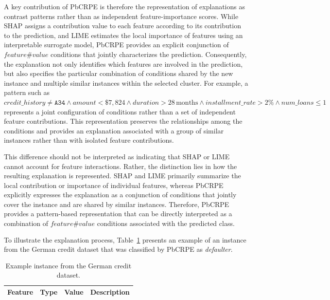 {A key contribution of PbCRPE is therefore the representation of explanations as contrast patterns rather than as independent feature-importance scores. While SHAP assigns a contribution value to each feature according to its contribution to the prediction, and LIME estimates the local importance of features using an interpretable surrogate model, PbCRPE provides an explicit conjunction of $feature\#value$ conditions that jointly characterizes the prediction. Consequently, the explanation not only identifies which features are involved in the prediction, but also specifies the particular combination of conditions shared by the new instance and multiple similar instances within the selected cluster. For example, a pattern such as $\mathit{credit\_history} \neq \texttt{A34} \wedge \mathit{amount} < \$7{,}824 \wedge \mathit{duration} > 28\,\mathrm{months} \wedge \mathit{installment\_rate} > 2\% \wedge \mathit{num\_loans} \leq 1$ represents a joint configuration of conditions rather than a set of independent feature contributions. This representation preserves the relationships among the conditions and provides an explanation associated with a group of similar instances rather than with isolated feature contributions.\newline

This difference should not be interpreted as indicating that SHAP or LIME cannot account for feature interactions. Rather, the distinction lies in how the resulting explanation is represented. SHAP and LIME primarily summarize the local contribution or importance of individual features, whereas PbCRPE explicitly expresses the explanation as a conjunction of conditions that jointly cover the instance and are shared by similar instances. Therefore, PbCRPE provides a pattern-based representation that can be directly interpreted as a combination of $feature\#value$ conditions associated with the predicted class.\newline

To illustrate the explanation process, Table~\ref{tab:example_instance} presents an example of an instance from the German credit dataset that was classified by PbCRPE as \textit{defaulter}.\newline

\begin{table}[H]
	\centering
	\caption{Example instance from the German credit dataset.}
	\label{tab:example_instance}
	\renewcommand{\arraystretch}{1.15}
	\begin{tabularx}{\textwidth}{
			>{\raggedright\arraybackslash}p{}
			>{\centering\arraybackslash}p{}
			>{\centering\arraybackslash}p{}
			X
		}
		\toprule
		\textbf{Feature} & \textbf{Type} & \textbf{Value} & \textbf{Description} \\
		\midrule
		

\end{tabularx}
\end{table}}
